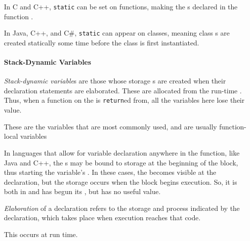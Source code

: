 \begin{remark*}
  In C and C++, \texttt{static} can be set on functions, making the s declared in the function .
\end{remark*}

\begin{remark*}
  In Java, C++, and C\#, \texttt{static} can appear on classes, meaning class s are created statically some time before the class is first instantiated.
\end{remark*}

\paragraph{Stack-Dynamic Variables}\label{par:Stack-Dynamic_Variable_Binding_Lifetime}
\begin{definition}\label{def:Stack-Dynamic_Variable_Binding_Lifetime}
  \emph{Stack-dynamic variable}s are those whose storage s are created when their declaration statements are elaborated.
  These are allocated from the run-time .
  Thus, when a function on the  is \texttt{return}ed from, all the variables here lose their value.

  \begin{remark}
    These are the variables that are most commonly used, and are usually function-local variables
  \end{remark}

  \begin{remark}
    In languages that allow for variable declaration anywhere in the function, like Java and C++, the s may be bound to storage at the beginning of the block, thus starting the variable's .
    In these cases, the  becomes visible at the declaration, but the storage  occurs when the block begins execution.
    So, it is both in  and has begun its , but has no useful value.
  \end{remark}
\end{definition}

\begin{definition}[Elaboration]\label{def:Variable_Storage_Binding_Elaboration}
  \emph{Elaboration} of a  declaration refers to the storage  and  process indicated by the declaration, which takes place when execution reaches that code.

  This occurs at run time.
\end{definition}

